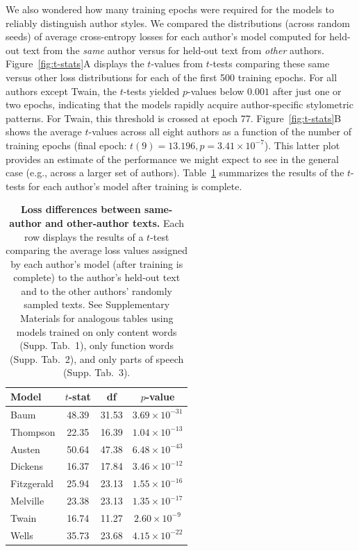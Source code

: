 \documentclass{llmxive}
\providecommand{\authortableContent}{{1}}
\providecommand{\authortableFunction}{{2}}
\providecommand{\authortablePOS}{{3}}
\begin{document}
We also wondered how many training epochs were required for the models to
reliably distinguish author styles. We compared the distributions (across
random seeds) of average cross-entropy losses for each author's model computed
for held-out text from the \textit{same} author versus for held-out text from
\textit{other} authors. Figure~\ref{fig:t-stats}A displays the $t$-values from
$t$-tests comparing these same versus other loss distributions for each of the
first 500 training epochs. For all authors except Twain, the $t$-tests yielded
$p$-values below $0.001$ after just one or two epochs, indicating that the models
rapidly acquire author-specific stylometric patterns. For Twain, this threshold
is crossed at epoch 77. Figure~\ref{fig:t-stats}B shows the average $t$-values
across all eight authors as a function of the number of training epochs (final
epoch: $t(9) = 13.196, p = 3.41 \times 10^{-7}$). This latter plot provides an
estimate of the performance we might expect to see in the general case (e.g.,
across a larger set of authors). Table~\ref{tab:t-tests} summarizes the results
of the $t$-tests for each author's model after training is complete.

\begin{table}[!htbp]
\centering
\small
\begin{tabular}{lccc}
\hline
\textbf{Model} & \textbf{$t$-stat} & \textbf{df} & \textbf{$p$-value}\\
\hline
Baum        & 48.39 & 31.53 & $3.69 \times 10^{-31}$  \\
Thompson    & 22.35 & 16.39 & $1.04 \times 10^{-13}$ \\
Austen      & 50.64 & 47.38 & $6.48 \times 10^{-43}$ \\
Dickens     & 16.37 & 17.84 & $3.46 \times 10^{-12}$ \\
Fitzgerald  & 25.94 & 23.13 & $1.55 \times 10^{-16}$ \\
Melville    & 23.38 & 23.13 & $1.35 \times 10^{-17}$ \\
Twain       & 16.74 & 11.27 & $2.60 \times 10^{-9}$ \\
Wells       & 35.73 & 23.68 & $4.15 \times 10^{-22}$ \\
\hline
\end{tabular}

\caption{\textbf{Loss differences between same-author and other-author texts.}
Each row displays the results of a $t$-test comparing the average loss values
assigned by each author's model (after training is complete) to the author's
held-out text and to the other authors' randomly sampled texts. See
Supplementary Materials for analogous tables using models trained on only
content words (Supp. Tab.~\authortableContent), only function words (Supp.
Tab.~\authortableFunction), and only parts of speech (Supp.
Tab.~\authortablePOS).}

\label{tab:t-tests}
\end{table}
\end{document}
